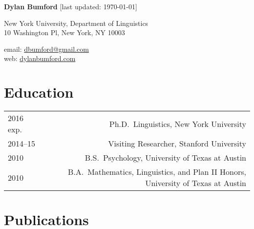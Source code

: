 \documentclass[11pt]{article}
\begin{document}
\textbf{Dylan Bumford}\hfill
{\color{gray}[last updated: \today]}

\bigskip

\begin{minipage}[t]{0.55\textwidth}
New York University, Department of Linguistics\\
10 Washington Pl, New York, NY 10003
\end{minipage}
\begin{minipage}[t]{0.45\textwidth}
email: \href{mailto:dbumford@gmail.com}{dbumford@gmail.com}\\
web: \url{dylanbumford.com}
\end{minipage}


\section*{Education}

\begin{longtable}{LR}
  2016 exp.   & Ph.D.~Linguistics, New York University\\
  2014--15    & Visiting Researcher, Stanford University\\
  2010        & B.S.~Psychology, University of Texas at Austin\\
  2010        & B.A.~Mathematics, Linguistics, and Plan II Honors, University of
                Texas at Austin
\end{longtable}

\section*{Publications}
\end{document}
